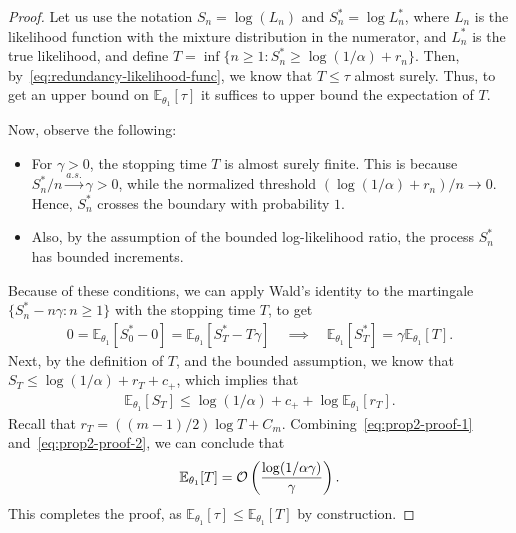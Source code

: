\documentclass[12pt]{article}
\begin{document}
\begin{proof}
    Let us use the notation $S_n = \log(L_n)$ and $S^*_n = \log L^*_n$, where $L_n$ is the likelihood function with the mixture distribution in the numerator, and  $L^*_n$ is the true likelihood, and define $T = \inf \{n \geq 1: S_n^* \geq \log(1/\alpha) + r_n\}$. Then, by~\eqref{eq:redundancy-likelihood-func}, we know that $T \leq \tau$ almost surely. Thus, to get an upper bound on $\mathbb{E}_{\theta_1}[\tau]$ it suffices to upper bound the expectation of $T$. 

    Now, observe the following: 
    \begin{itemize}
        \item For $\gamma > 0$, the stopping time $T$ is almost surely finite. This is because $S_n^*/n \stackrel{a.s.}{\to} \gamma >0$, while the normalized threshold $(\log(1/\alpha) + r_n)/n \to 0$. Hence, $S_n^*$ crosses the boundary with probability $1$. 

        \item Also, by the assumption of the bounded log-likelihood ratio, the process $S_n^*$ has bounded increments. 
    \end{itemize}
    Because of these conditions, we can apply Wald's identity to the martingale $\{S_n^* -n \gamma: n \geq 1\}$ with the stopping time $T$, to get 
    \begin{align}
        0 = \mathbb{E}_{\theta_1}[S_0^* - 0] = \mathbb{E}_{\theta_1}[S_T^* - T \gamma] \quad \implies \quad \mathbb{E}_{\theta_1}[S_T^*] = \gamma \mathbb{E}_{\theta_1}[T]. \label{eq:prop2-proof-1}
    \end{align}
    Next, by the definition of $T$, and the bounded assumption, we know that $S_T \leq \log(1/\alpha) + r_T + c_+$, which implies that  
    \begin{align}
        \mathbb{E}_{\theta_1}[S_T]\leq \log(1/\alpha) + c_+ + \log \mathbb{E}_{\theta_1}[r_T].  \label{eq:prop2-proof-2}
    \end{align}
    Recall that $r_T = ((m-1)/2) \log T + C_m$. Combining~\eqref{eq:prop2-proof-1} and~\eqref{eq:prop2-proof-2}, we can conclude that 
    \begin{align}
        \mathbb{E}_{\theta_1}[T] = \mathcal{O}\left( \frac{\log(1/\alpha \gamma)}{\gamma} \right). 
    \end{align}
    This completes the proof, as $\mathbb{E}_{\theta_1}[\tau] \leq \mathbb{E}_{\theta_1}[T]$ by construction. 
    
\end{proof}
\end{document}
